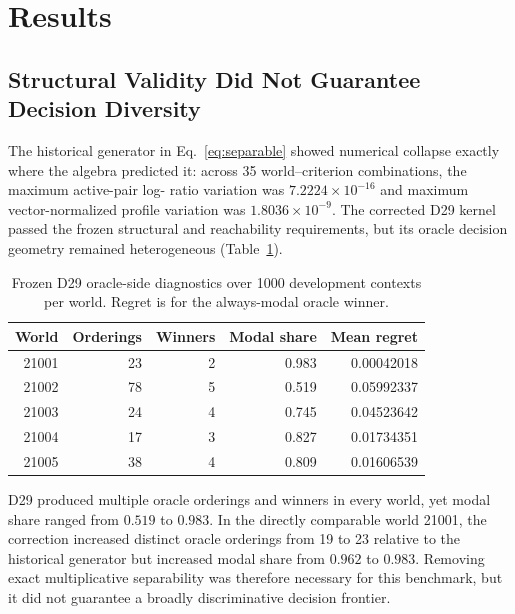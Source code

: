 \documentclass[runningheads]{llncs}
\begin{document}
\section{Results}
\label{sec:results}

\subsection{Structural Validity Did Not Guarantee Decision Diversity}

The historical generator in Eq.~\eqref{eq:separable} showed numerical collapse exactly where
the algebra predicted it: across 35 world--criterion combinations, the maximum active-pair log-
ratio variation was $7.2224\times10^{-16}$ and maximum vector-normalized profile variation was
$1.8036\times10^{-9}$. The corrected D29 kernel passed the frozen structural and reachability
requirements, but its oracle decision geometry remained heterogeneous (Table~\ref{tab:d29}).

\begin{table}[t]
\centering
\caption{Frozen D29 oracle-side diagnostics over 1000 development contexts per world. Regret is
for the always-modal oracle winner.}
\label{tab:d29}
\small
\begin{tabular}{@{}r r r r r@{}}
\toprule
World & Orderings & Winners & Modal share & Mean regret\\
\midrule
21001 & 23 & 2 & 0.983 & 0.00042018\\
21002 & 78 & 5 & 0.519 & 0.05992337\\
21003 & 24 & 4 & 0.745 & 0.04523642\\
21004 & 17 & 3 & 0.827 & 0.01734351\\
21005 & 38 & 4 & 0.809 & 0.01606539\\
\bottomrule
\end{tabular}
\end{table}

D29 produced multiple oracle orderings and winners in every world, yet modal share ranged from
$0.519$ to $0.983$. In the directly comparable world 21001, the correction increased distinct
oracle orderings from 19 to 23 relative to the historical generator but increased modal share
from $0.962$ to $0.983$. Removing exact multiplicative separability was therefore necessary for
this benchmark, but it did not guarantee a broadly discriminative decision frontier.
\end{document}
